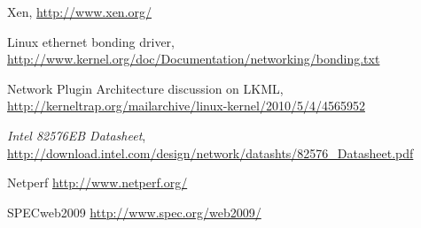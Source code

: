 \begin{thebibliography}{99}
 Xen, \url{http://www.xen.org/}

 Linux ethernet bonding driver,
  \url{http://www.kernel.org/doc/Documentation/networking/bonding.txt}

 Network Plugin Architecture discussion on LKML,
  \url{http://kerneltrap.org/mailarchive/linux-kernel/2010/5/4/4565952}

 \emph{Intel 82576EB Datasheet},
  \url{http://download.intel.com/design/network/datashts/82576_Datasheet.pdf}

 Netperf \url{http://www.netperf.org/}

 SPECweb2009 \url{http://www.spec.org/web2009/}

\end{thebibliography}
